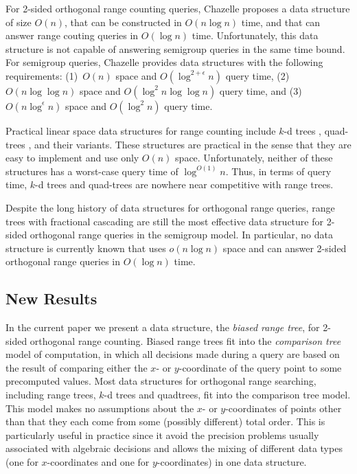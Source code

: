 \documentclass[charterfonts]{patmorin}
\begin{document}
For 2-sided orthogonal range counting queries, Chazelle
\cite{ae55,ae58} proposes a data structure of size $O(n)$, that can be
constructed in $O(n\log n)$ time, and that can answer range couting
queries in $O(\log n)$ time.  Unfortunately, this data structure is
not capable of answering semigroup queries in the same time bound.
For semigroup queries, Chazelle provides data structures with the
following requirements: (1)~$O(n)$ space and $O(\log^{2+\epsilon} n)$
query time, (2)~$O(n\log\log n)$ space and $O(\log^{2}n\log\log n)$
query time, and (3)~$O(n\log^\epsilon n)$ space and $O(\log^2 n)$
query time.

Practical linear space data structures for range counting include
$k$-d trees \cite{ae41}, quad-trees \cite{ae251}, and their
variants.  These structures are practical in the sense that they are
easy to implement and use only $O(n)$ space.  Unfortunately, neither
of these structures has a worst-case query time of $\log^{O(1)} n$.
Thus, in terms of query time, $k$-d trees and quad-trees are nowhere
near competitive with range trees.


Despite the long history of data structures for orthogonal range
queries, range trees with fractional cascading are still the most
effective data structure for 2-sided orthogonal range queries in the
semigroup model.  In particular, no data structure is currently known
that uses $o(n\log n)$ space and can answer 2-sided orthogonal range
queries in $O(\log n)$ time. 

\subsection{New Results}

In the current paper we present a data structure, the \emph{biased
range tree}, for 2-sided orthogonal range counting.  Biased range
trees fit into the \emph{comparison tree} model of computation, in
which all decisions made during a query are based on the result of
comparing either the $x$- or $y$-coordinate of the query point to some
precomputed values.  Most data structures for orthogonal range
searching, including range trees, $k$-d trees and quadtrees, fit into
the comparison tree model. This model makes no assumptions about the
$x$- or $y$-coordinates of points other than that they each come from
some (possibly different) total order.  This is particularly useful in
practice since it avoid the precision problems usually associated with
algebraic decisions and allows the mixing of different data types
(one for $x$-coordinates and one for $y$-coordinates) in one data
structure.
\end{document}
